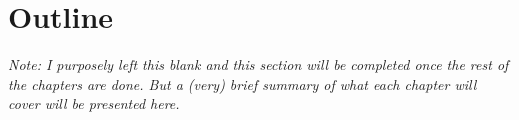 \begin{comment}
Just an outline and short description of each chapter.
\end{comment}

\section{Outline}

\textit{Note: I purposely left this blank and this section will be completed once the rest of the chapters are done.
But a (very) brief summary of what each chapter will cover will be presented here.}

